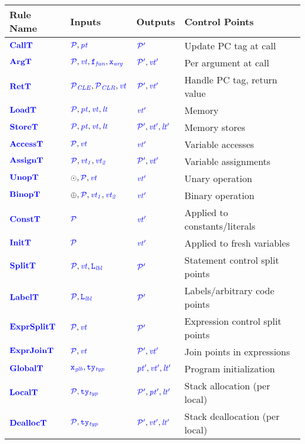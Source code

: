 \documentclass{llncs}
\begin{document}
\begin{table}[t]
  \begin{tabular}{|l|l|l|l|}
    \hline
    Rule Name & Inputs & Outputs & Control Points \\
    \hline
    \(\calltname\)      & \(\calltargs\)         & \(\calltres\)      & Update PC tag at call \\
    \(\argtname\)       & \(\argtargs\)          & \(\argtres\)       & Per argument at call \\
    \(\rettname\)       & \(\rettargs\)          & \(\rettres\)       & Handle PC tag, return value \\
    \(\loadtname\)      & \(\loadtargs\)         & \(\loadtres\)      & Memory  \\
    \(\storetname\)     & \(\storetargs\)        & \(\storetres\)     & Memory stores \\
    \(\accesstname\)    & \(\accesstargs\)       & \(\accesstres\)    & Variable accesses \\
    \(\assigntname\)    & \(\assigntargs\)       & \(\assigntres\)    & Variable assignments \\
    \(\unoptname\)      & \(\unoptargs\)         & \(\unoptres\)      & Unary operation \\
    \(\binoptname\)     & \(\binoptargs\)        & \(\binoptres\)     & Binary operation \\
    \(\consttname\)     & \(\consttargs\)        & \(\consttres\)     & Applied to constants/literals \\
    \(\inittname\)      & \(\inittargs\)         & \(\inittres\)      & Applied to fresh variables \\
    \(\splittname\)     & \(\splittargs\)        & \(\splittres\)     & Statement control split points \\
    \(\labeltname\)     & \(\labeltargs\)        & \(\labeltres\)     & Labels/arbitrary code points \\
    \(\exprsplittname\) & \(\exprsplittargs\)    & \(\exprsplittres\) & Expression control split points \\
    \(\exprjointname\)  & \(\exprjointargs\)     & \(\exprjointres\)  & Join points in expressions \\
    \(\globaltname\)    & \(\globaltargs\)       & \(\globaltres\)    & Program initialization \\
    \(\localtname\)     & \(\localtargs\)        & \(\localtres\)     & Stack allocation (per local) \\
    \(\dealloctname\)   & \(\dealloctargs\)      & \(\dealloctres\)   & Stack deallocation (per local) \\

\end{tabular}
\end{table}
\end{document}

